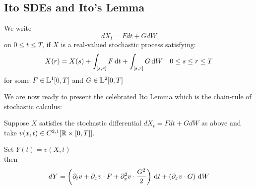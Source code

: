 \subsection{Ito SDEs and Ito's Lemma}
\begin{defn}

We write
\begin{equation}
dX_t = Fdt + G dW
\end{equation}
on $0 \leq t \leq T$, if $X$ is a real-valued stochastic process satisfying:
\begin{equation*}
X(r) = X(s) + \int_{[s,r]} F \, \mathrm{d} t + \int_{[s,r]} G \, \mathrm{d} W
\quad 0\leq s \leq r \leq T
\end{equation*}
for some $F \in {\mathbb{L}^1}[0,T]$ and $G \in {\mathbb{L}^2}[0,T]$
\end{defn}

We are now ready to present the celebrated Ito Lemma which is the chain-rule of
stochastic calculus:

\begin{thm}

Suppose $X$ satisfies the stochastic differential $dX_t =
Fdt + G dW$ as above and take $v(x,t) \in C^{2,1}[ { \mathbb{R} } \times [0,T]]$.

Set $Y(t) = v(X,t)$
\\
then
$$
dY =  \left( {\partial}_t v + {\partial}_x v \cdot F + {\partial}^2_x v \cdot \frac{G^2}2 \right)
\, \mathrm{d} t + \left(   {\partial}_x v\cdot G  \right)\, \mathrm{d} W
$$
\end{thm}

